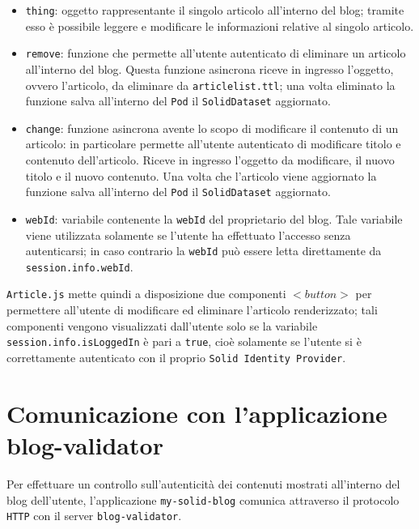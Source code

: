 \begin{itemize}
	\item {\tt thing}: oggetto rappresentante il singolo articolo all'interno del blog; tramite esso è possibile leggere e modificare le informazioni relative al singolo articolo.
	\item {\tt remove}: funzione che permette all'utente autenticato di eliminare un articolo all'interno del blog. Questa funzione asincrona riceve in ingresso l'oggetto, ovvero l'articolo, da eliminare da {\tt articlelist.ttl}; una volta eliminato la funzione salva all'interno del {\tt Pod} il {\tt SolidDataset} aggiornato.
	\item {\tt change}: funzione asincrona avente lo scopo di modificare il contenuto di un articolo: in particolare permette all'utente autenticato di modificare titolo e contenuto dell'articolo. Riceve in ingresso l'oggetto da modificare, il nuovo titolo e il nuovo contenuto. Una volta che l'articolo viene aggiornato la funzione salva all'interno del {\tt Pod} il {\tt SolidDataset} aggiornato.
	\item {\tt webId}: variabile contenente la {\tt webId} del proprietario del blog. Tale variabile viene utilizzata solamente se l'utente ha effettuato l'accesso senza autenticarsi; in caso contrario la {\tt webId} può essere letta direttamente da {\tt session.info.webId}.
\end{itemize}

\bigskip

{\tt Article.js} mette quindi a disposizione due componenti $<button>$ per permettere all'utente di modificare ed eliminare l'articolo renderizzato; tali componenti vengono visualizzati dall'utente solo se la variabile {\tt session.info.isLoggedIn} è pari a {\tt true}, cioè solamente se l'utente si è correttamente autenticato con il proprio {\tt Solid Identity Provider}.

\bigskip


\section{Comunicazione con l'applicazione blog-validator}

\medskip

Per effettuare un controllo sull'autenticità dei contenuti mostrati all'interno del blog dell'utente, l'applicazione {\tt my-solid-blog} comunica attraverso il protocolo {\tt HTTP} con il server {\tt blog-validator}.

\bigskip

